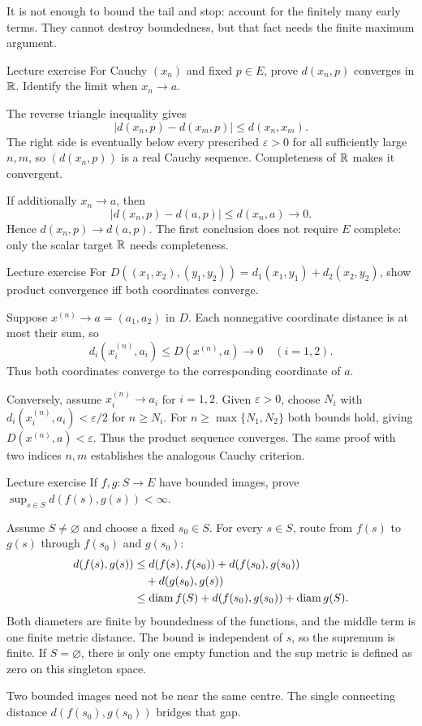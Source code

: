 \begin{tip}
It is not enough to bound the tail and stop: account for the finitely many early terms. They cannot destroy boundedness, but that fact needs the finite maximum argument.
\end{tip}
\begin{exam}{Lecture exercise}
For Cauchy $(x_n)$ and fixed $p\in E$, prove $d(x_n,p)$ converges in $\mathbb R$. Identify the limit when $x_n\to a$.
\end{exam}
\begin{answer}
The reverse triangle inequality gives
\[|d(x_n,p)-d(x_m,p)|\le d(x_n,x_m).\]
The right side is eventually below every prescribed $\varepsilon>0$ for all sufficiently large $n,m$, so $(d(x_n,p))$ is a real Cauchy sequence. Completeness of $\mathbb R$ makes it convergent.

If additionally $x_n\to a$, then
\[|d(x_n,p)-d(a,p)|\le d(x_n,a)\to0.\]
Hence $d(x_n,p)\to d(a,p)$. The first conclusion does not require $E$ complete: only the scalar target $\mathbb R$ needs completeness.
\end{answer}
\begin{exam}{Lecture exercise}
For $D((x_1,x_2),(y_1,y_2))=d_1(x_1,y_1)+d_2(x_2,y_2)$, show product convergence iff both coordinates converge.
\end{exam}
\begin{answer}
Suppose $x^{(n)}\to a=(a_1,a_2)$ in $D$. Each nonnegative coordinate distance is at most their sum, so
\[d_i(x_i^{(n)},a_i)\le D(x^{(n)},a)\to0\quad(i=1,2).\]
Thus both coordinates converge to the corresponding coordinate of $a$.

Conversely, assume $x_i^{(n)}\to a_i$ for $i=1,2$. Given $\varepsilon>0$, choose $N_i$ with $d_i(x_i^{(n)},a_i)<\varepsilon/2$ for $n\ge N_i$. For $n\ge\max\{N_1,N_2\}$ both bounds hold, giving $D(x^{(n)},a)<\varepsilon$. Thus the product sequence converges. The same proof with two indices $n,m$ establishes the analogous Cauchy criterion.
\end{answer}
\begin{exam}{Lecture exercise}
If $f,g:S\to E$ have bounded images, prove $\sup_{s\in S}d(f(s),g(s))<\infty$.
\end{exam}
\begin{answer}
Assume $S\ne\varnothing$ and choose a fixed $s_0\in S$. For every $s\in S$, route from $f(s)$ to $g(s)$ through $f(s_0)$ and $g(s_0)$:
\begin{align*}
d(f(s),g(s))&\le d(f(s),f(s_0))+d(f(s_0),g(s_0))\\
&\quad+d(g(s_0),g(s))\\
&\le\operatorname{diam} f(S)+d(f(s_0),g(s_0))+\operatorname{diam} g(S).
\end{align*}
Both diameters are finite by boundedness of the functions, and the middle term is one finite metric distance. The bound is independent of $s$, so the supremum is finite. If $S=\varnothing$, there is only one empty function and the sup metric is defined as zero on this singleton space.
\end{answer}
\begin{tip}
Two bounded images need not be near the same centre. The single connecting distance $d(f(s_0),g(s_0))$ bridges that gap.
\end{tip}
